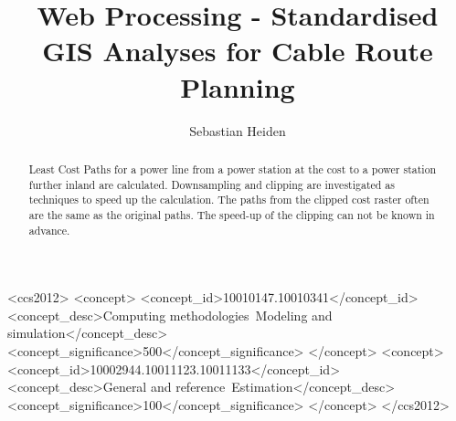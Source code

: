 \documentclass[acmtog]{acmart}
\begin{document}
	\title{Web Processing - Standardised GIS Analyses for Cable Route Planning}
	
	\author{Sebastian Heiden}
	
	
	\renewcommand{\shortauthors}{Heiden}
	
	\begin{abstract}
		Least Cost Paths for a power line from a power station at the cost to a power station further inland are calculated.
		Downsampling and clipping are investigated as techniques to speed up the calculation.
		The paths from the clipped cost raster often are the same as the original paths.
		The speed-up of the clipping can not be known in advance.
	\end{abstract}
	
	\begin{CCSXML}
		<ccs2012>
		<concept>
		<concept_id>10010147.10010341</concept_id>
		<concept_desc>Computing methodologies~Modeling and simulation</concept_desc>
		<concept_significance>500</concept_significance>
		</concept>
		<concept>
		<concept_id>10002944.10011123.10011133</concept_id>
		<concept_desc>General and reference~Estimation</concept_desc>
		<concept_significance>100</concept_significance>
		</concept>
		</ccs2012>
	\end{CCSXML}
	


	
	
	
	\maketitle
	
\end{document}
